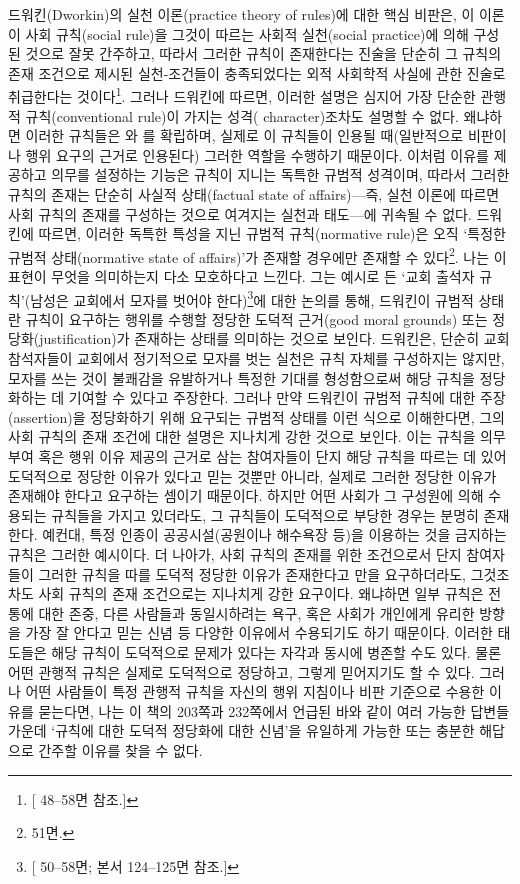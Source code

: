 드워킨(Dworkin)의 실천 이론(practice theory of rules)에 대한 핵심
비판은, 이 이론이 사회 규칙(social rule)을 그것이 따르는 사회적
실천(social practice)에 의해 구성된 것으로 잘못 간주하고, 따라서 그러한
규칙이 존재한다는 진술을 단순히 그 규칙의 존재 조건으로 제시된
실천-조건들이 충족되었다는 외적 사회학적 사실에 관한 진술로 취급한다는
것이다\footnote{{[} 48--58면 참조.{]}}. 그러나 드워킨에
따르면, 이러한 설명은 심지어 가장 단순한 관행적 규칙(conventional
rule)이 가지는  성격( character)조차도
설명할 수 없다. 왜냐하면 이러한 규칙들은 와
를 확립하며, 실제로 이
규칙들이 인용될 때(일반적으로 비판이나 행위 요구의 근거로 인용된다)
그러한 역할을 수행하기 때문이다. 이처럼 이유를 제공하고 의무를 설정하는
기능은 규칙이 지니는 독특한 규범적 성격이며, 따라서 그러한 규칙의 존재는
단순히 사실적 상태(factual state of affairs)---즉, 실천 이론에 따르면
사회 규칙의 존재를 구성하는 것으로 여겨지는 실천과 태도---에 귀속될 수
없다. 드워킨에 따르면, 이러한 독특한 특성을 지닌 규범적 규칙(normative
rule)은 오직 `특정한 규범적 상태(normative state of affairs)'가 존재할
경우에만 존재할 수 있다\footnote{ 51면.}. 나는 이 표현이
무엇을 의미하는지 다소 모호하다고 느낀다. 그는 예시로 든 `교회 출석자
규칙'(남성은 교회에서 모자를 벗어야 한다)\footnote{{[}
  50--58면; 본서 124--125면 참조.{]}}에 대한 논의를 통해, 드워킨이
규범적 상태란 규칙이 요구하는 행위를 수행할 정당한 도덕적 근거(good
moral grounds) 또는 정당화(justification)가 존재하는 상태를 의미하는
것으로 보인다. 드워킨은, 단순히 교회 참석자들이 교회에서 정기적으로
모자를 벗는 실천은 규칙 자체를 구성하지는 않지만, 모자를 쓰는 것이
불쾌감을 유발하거나 특정한 기대를 형성함으로써 해당 규칙을 정당화하는 데
기여할 수 있다고 주장한다. 그러나 만약 드워킨이 규범적 규칙에 대한
주장(assertion)을 정당화하기 위해 요구되는 규범적 상태를 이런 식으로
이해한다면, 그의 사회 규칙의 존재 조건에 대한 설명은 지나치게 강한
것으로 보인다. 이는 규칙을 의무 부여 혹은 행위 이유 제공의 근거로 삼는
참여자들이 단지 해당 규칙을 따르는 데 있어 도덕적으로 정당한 이유가
있다고 믿는 것뿐만 아니라, 실제로 그러한 정당한 이유가 존재해야 한다고
요구하는 셈이기 때문이다. 하지만 어떤 사회가 그 구성원에 의해 수용되는
규칙들을 가지고 있더라도, 그 규칙들이 도덕적으로 부당한 경우는 분명히
존재한다. 예컨대, 특정 인종이 공공시설(공원이나 해수욕장 등)을 이용하는
것을 금지하는 규칙은 그러한 예시이다. 더 나아가, 사회 규칙의 존재를 위한
조건으로서 단지 참여자들이 그러한 규칙을 따를 도덕적 정당한 이유가
존재한다고 만을 요구하더라도, 그것조차도 사회
규칙의 존재 조건으로는 지나치게 강한 요구이다. 왜냐하면 일부 규칙은
전통에 대한 존중, 다른 사람들과 동일시하려는 욕구, 혹은 사회가 개인에게
유리한 방향을 가장 잘 안다고 믿는 신념 등 다양한 이유에서 수용되기도
하기 때문이다. 이러한 태도들은 해당 규칙이 도덕적으로 문제가 있다는
자각과 동시에 병존할 수도 있다. 물론 어떤 관행적 규칙은 실제로
도덕적으로 정당하고, 그렇게 믿어지기도 할 수 있다. 그러나 어떤 사람들이
특정 관행적 규칙을 자신의 행위 지침이나 비판 기준으로 수용한 이유를
묻는다면, 나는 이 책의 203쪽과 232쪽에서 언급된 바와 같이 여러 가능한
답변들 가운데 `규칙에 대한 도덕적 정당화에 대한 신념'을 유일하게 가능한
또는 충분한 해답으로 간주할 이유를 찾을 수 없다.

